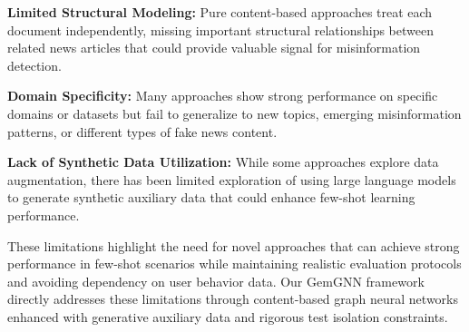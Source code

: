 \textbf{Limited Structural Modeling:} Pure content-based approaches treat each document independently, missing important structural relationships between related news articles that could provide valuable signal for misinformation detection.

\textbf{Domain Specificity:} Many approaches show strong performance on specific domains or datasets but fail to generalize to new topics, emerging misinformation patterns, or different types of fake news content.

\textbf{Lack of Synthetic Data Utilization:} While some approaches explore data augmentation, there has been limited exploration of using large language models to generate synthetic auxiliary data that could enhance few-shot learning performance.

These limitations highlight the need for novel approaches that can achieve strong performance in few-shot scenarios while maintaining realistic evaluation protocols and avoiding dependency on user behavior data. Our GemGNN framework directly addresses these limitations through content-based graph neural networks enhanced with generative auxiliary data and rigorous test isolation constraints.

\EndChapter
